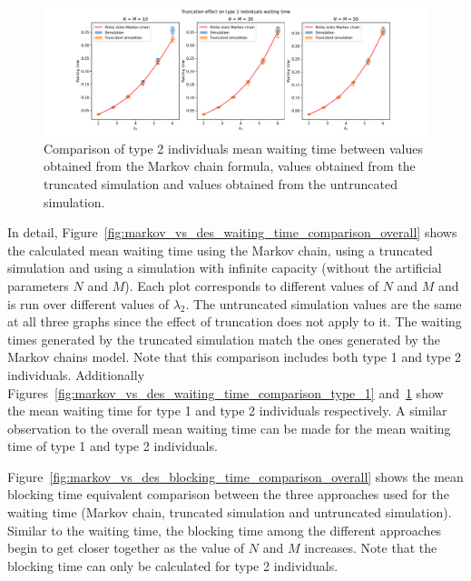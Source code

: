 \begin{figure}[H]
    \includegraphics[width=\textwidth]{chapters/03_queueing_model/Bin/numeric_results_and_timings/truncation_effect/waiting_time_type_2.pdf}
    \caption{
        Comparison of type 2 individuals mean waiting time between values
        obtained from the Markov chain formula, values obtained from the
        truncated simulation and values obtained from the untruncated
        simulation.
    }
    \label{fig:markov_vs_des_waiting_time_comparison_type_2}
\end{figure}

In detail, Figure~\ref{fig:markov_vs_des_waiting_time_comparison_overall} shows
the calculated mean waiting time using the Markov chain, using a truncated
simulation and using a simulation with infinite capacity (without the artificial
parameters \(N\) and \(M\)).
Each plot corresponds to different values of \(N\) and \(M\) and is run over
different values of \(\lambda_2\).
The untruncated simulation values are the same at all three graphs since
the effect of truncation does not apply to it.
The waiting times generated by the truncated simulation match the ones generated
by the Markov chains model.
Note that this comparison includes both type 1 and type 2 individuals.
Additionally Figures~\ref{fig:markov_vs_des_waiting_time_comparison_type_1}
and~\ref{fig:markov_vs_des_waiting_time_comparison_type_2} show the mean waiting
time for type 1 and type 2 individuals respectively.
A similar observation to the overall mean waiting time can be made for the mean
waiting time of type 1 and type 2 individuals.


Figure~\ref{fig:markov_vs_des_blocking_time_comparison_overall} shows
the mean blocking time equivalent comparison between the three approaches used
for the waiting time (Markov chain, truncated simulation and untruncated
simulation).
Similar to the waiting time, the blocking time among the different approaches
begin to get closer together as the value of \(N\) and \(M\) increases.
Note that the blocking time can only be calculated for type 2 individuals.


